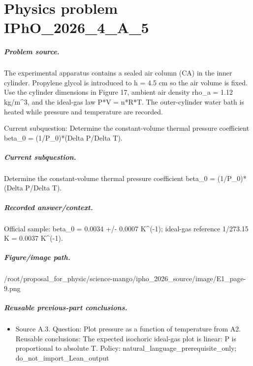 
\chapter{Physics problem IPhO\_2026\_4\_A\_5}
\label{ch:IPhO2026Problems_problem_IPhO_2026_4_A_5}

\paragraph{Problem source.}
The experimental apparatus contains a sealed air column (CA) in the inner
cylinder.  Propylene glycol is introduced to h = 4.5 cm so the air volume is
fixed.  Use the cylinder dimensions in Figure 17, ambient air density
rho\_a = 1.12 kg/m\textasciicircum{}3, and the ideal-gas law P*V = n*R*T.  The outer-cylinder
water bath is heated while pressure and temperature are recorded.

Current subquestion:
Determine the constant-volume thermal pressure coefficient beta\_0 = (1/P\_0)*(Delta P/Delta T).

\paragraph{Current subquestion.}
Determine the constant-volume thermal pressure coefficient beta\_0 = (1/P\_0)*(Delta P/Delta T).

\paragraph{Recorded answer/context.}
Official sample: beta\_0 = 0.0034 +/- 0.0007 K\textasciicircum{}(-1); ideal-gas reference 1/273.15 K = 0.0037 K\textasciicircum{}(-1).

\paragraph{Figure/image path.}
/root/proposal\_for\_physic/science-mango/ipho\_2026\_source/image/E1\_page-9.png

\paragraph{Reusable previous-part conclusions.}
\begin{itemize}
\item Source A.3. Question: Plot pressure as a function of temperature from A2. Reusable conclusions: The expected isochoric ideal-gas plot is linear: P is proportional to absolute T. Policy: natural\_language\_prerequisite\_only; do\_not\_import\_Lean\_output
\end{itemize}

